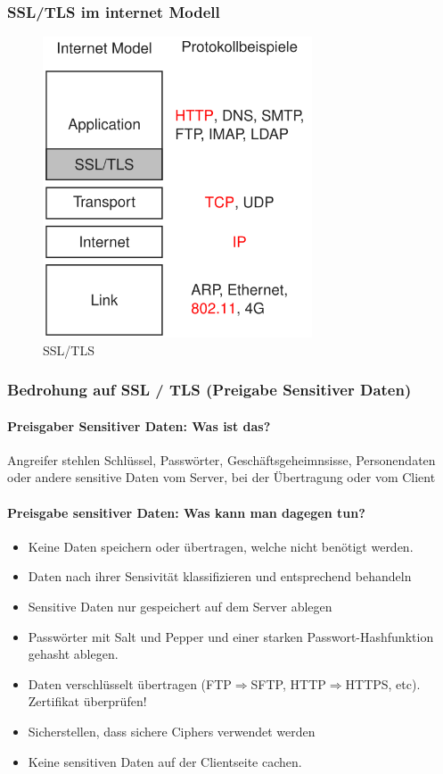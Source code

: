 \documentclass[10pt,a4paper]{article}
\begin{document}
\subsubsection*{SSL/TLS im internet Modell}
\begin{figure}[H]
    \begin{center}
    \includegraphics[width=8cm]{images/SSL-TLS.png}
    \caption{SSL/TLS}
    \label{SSL/TLS}
    \end{center}
\end{figure}

\subsubsection*{Bedrohung auf SSL / TLS (Preigabe Sensitiver Daten)}

\paragraph*{Preisgaber Sensitiver Daten: Was ist das?} Angreifer stehlen Schlüssel, Passwörter, Geschäftsgeheimnsisse,
Personendaten oder andere sensitive Daten vom Server, bei der Übertragung oder vom Client

\paragraph*{Preisgabe sensitiver Daten: Was kann man dagegen tun?}
\begin{itemize}[noitemsep,topsep=0pt,leftmargin=*]
    \item Keine Daten speichern oder übertragen, welche nicht benötigt werden.
    \item Daten nach ihrer Sensivität klassifizieren und entsprechend behandeln
    \item Sensitive Daten nur gespeichert auf dem Server ablegen
    \item Passwörter mit Salt und Pepper und einer starken Passwort-Hashfunktion gehasht ablegen.
    \item Daten verschlüsselt übertragen (FTP$\Rightarrow$SFTP, HTTP$\Rightarrow$HTTPS, etc). Zertifikat überprüfen!
    \item Sicherstellen, dass sichere Ciphers verwendet werden
    \item Keine sensitiven Daten auf der Clientseite cachen.
\end{itemize}
\end{document}
